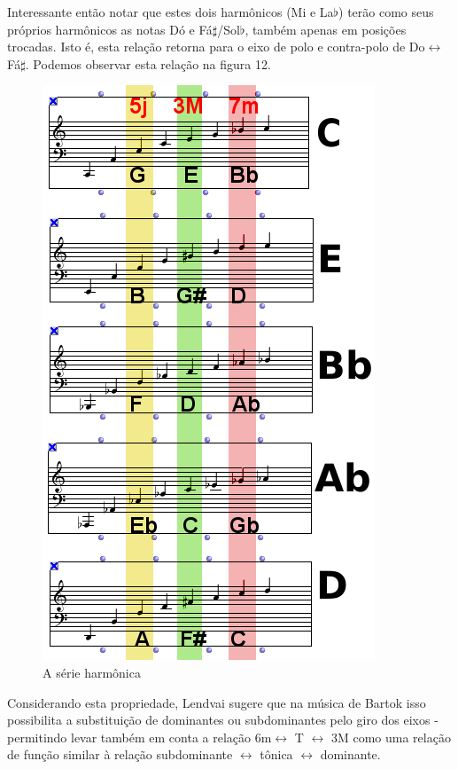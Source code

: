 \documentclass[
	12pt,				%
	openright,			%
	twoside,			%
	a4paper,			%
	english,			%
	french,				%
	spanish,			%
	brazil				%
	]{abntex2}
\begin{document}
Interessante então notar que estes dois harmônicos (Mi e La$\flat$) terão como seus próprios harmônicos as notas Dó e Fá$\sharp$/Sol$\flat$, também apenas em posições trocadas. Isto é, esta relação retorna para o eixo de polo e contra-polo de Do$\leftrightarrow$Fá$\sharp$. Podemos observar esta relação na figura 12.
 

\begin{figure}[!h]
	\caption{\label{fig_grafico}A série harmônica }
	\begin{center}
	    \includegraphics[scale=0.65]{axis/eixo_acustico.png}
	\end{center}
\end{figure}

Considerando esta propriedade, Lendvai sugere que na música de Bartok isso possibilita a substituição de dominantes ou subdominantes pelo giro dos eixos - permitindo levar também em conta a relação 6m$\leftrightarrow$ T $\leftrightarrow$ 3M como uma relação de função similar à relação subdominante $\leftrightarrow$ tônica $\leftrightarrow$ dominante. 
\end{document}
